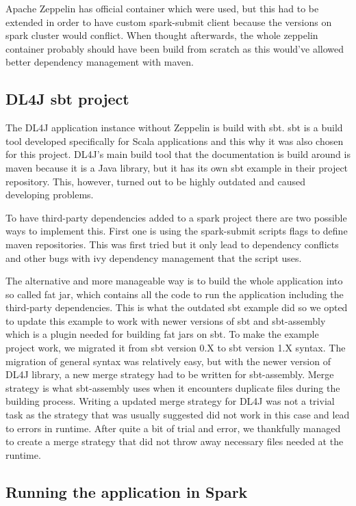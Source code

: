 Apache Zeppelin has official container which were used, but this had to be extended in order to have custom spark-submit client because the versions on spark cluster would conflict.
When thought afterwards, the whole zeppelin container probably should have been build from scratch as this would've allowed better dependency management with maven.

\subsection{DL4J sbt project}

The DL4J application instance without Zeppelin is build with sbt.
sbt is a build tool developed specifically for Scala applications and this why it was also chosen for this project.
DL4J's main build tool that the documentation is build around is maven because it is a Java library, but it has its own sbt example in their project repository.
This, however, turned out to be highly outdated and caused developing problems.

To have third-party dependencies added to a spark project there are two possible ways to implement this.
First one is using the spark-submit scripts flags to define maven repositories.
This was first tried but it only lead to dependency conflicts and other bugs with ivy dependency management that the script uses.

The alternative and more manageable way is to build the whole application into so called fat jar, which contains all the code to run the application including the third-party dependencies.
This is what the outdated sbt example did so we opted to update this example to work with newer versions of sbt and sbt-assembly which is a plugin needed for building fat jars on sbt.
To make the example project work, we migrated it from sbt version 0.X to sbt version 1.X syntax. 
The migration of general syntax was relatively easy, but with the newer version of DL4J library, a new merge strategy had to be written for sbt-assembly.
Merge strategy is what sbt-assembly uses when it encounters duplicate files during the building process.
Writing a updated merge strategy for DL4J was not a trivial task as the strategy that was usually suggested did not work in this case and lead to errors in runtime.
After quite a bit of trial and error, we thankfully managed to create a merge strategy that did not throw away necessary files needed at the runtime.

\subsection{Running the application in Spark}

